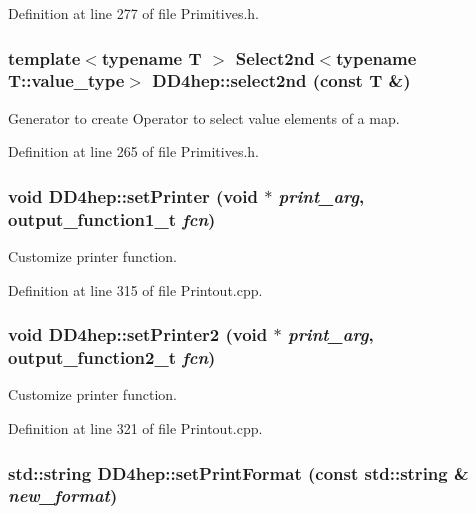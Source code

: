 Definition at line 277 of file Primitives.h.\hypertarget{namespace_d_d4hep_aa8249774a9afc934f855373b93480203}{
\subsubsection[{select2nd}]{\setlength{\rightskip}{0pt plus 5cm}template$<$typename T $>$ {\bf Select2nd}$<$typename T::value\_\-type$>$ DD4hep::select2nd (const {\bf T} \&)}}
\label{namespace_d_d4hep_aa8249774a9afc934f855373b93480203}


Generator to create Operator to select value elements of a map. 

Definition at line 265 of file Primitives.h.\hypertarget{namespace_d_d4hep_a598efc9dd592c6ab1dd96be38bf5f9f8}{
\subsubsection[{setPrinter}]{\setlength{\rightskip}{0pt plus 5cm}void DD4hep::setPrinter (void $\ast$ {\em print\_\-arg}, \/  output\_\-function1\_\-t {\em fcn})}}
\label{namespace_d_d4hep_a598efc9dd592c6ab1dd96be38bf5f9f8}


Customize printer function. 

Definition at line 315 of file Printout.cpp.\hypertarget{namespace_d_d4hep_a5109e91adaa5c7b3de87e2f53291ff64}{
\subsubsection[{setPrinter2}]{\setlength{\rightskip}{0pt plus 5cm}void DD4hep::setPrinter2 (void $\ast$ {\em print\_\-arg}, \/  output\_\-function2\_\-t {\em fcn})}}
\label{namespace_d_d4hep_a5109e91adaa5c7b3de87e2f53291ff64}


Customize printer function. 

Definition at line 321 of file Printout.cpp.\hypertarget{namespace_d_d4hep_ac123c32a67d87f38c9cfcdbf67e0fe19}{
\subsubsection[{setPrintFormat}]{\setlength{\rightskip}{0pt plus 5cm}std::string DD4hep::setPrintFormat (const std::string \& {\em new\_\-format})}}
\label{namespace_d_d4hep_ac123c32a67d87f38c9cfcdbf67e0fe19}


